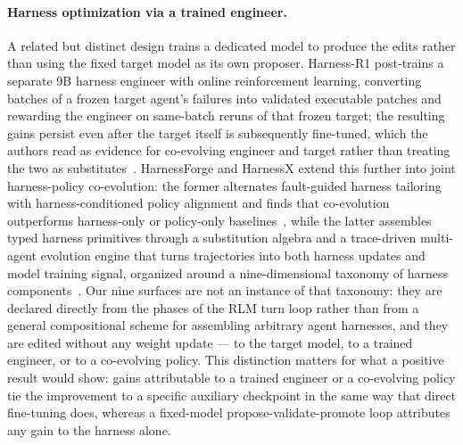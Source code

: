 \documentclass{article}
\begin{document}
\paragraph{Harness optimization via a trained engineer.}
A related but distinct design trains a dedicated model to produce the edits rather than using the fixed target model as its own proposer. Harness-R1 post-trains a separate 9B harness engineer with online reinforcement learning, converting batches of a frozen target agent's failures into validated executable patches and rewarding the engineer on same-batch reruns of that frozen target; the resulting gains persist even after the target itself is subsequently fine-tuned, which the authors read as evidence for co-evolving engineer and target rather than treating the two as substitutes~\citep{shao2026harnessr1}. HarnessForge and HarnessX extend this further into joint harness-policy co-evolution: the former alternates fault-guided harness tailoring with harness-conditioned policy alignment and finds that co-evolution outperforms harness-only or policy-only baselines~\citep{chen2026harnessforge}, while the latter assembles typed harness primitives through a substitution algebra and a trace-driven multi-agent evolution engine that turns trajectories into both harness updates and model training signal, organized around a nine-dimensional taxonomy of harness components~\citep{chen2026harnessx}. Our nine surfaces are not an instance of that taxonomy: they are declared directly from the phases of the RLM turn loop rather than from a general compositional scheme for assembling arbitrary agent harnesses, and they are edited without any weight update --- to the target model, to a trained engineer, or to a co-evolving policy. This distinction matters for what a positive result would show: gains attributable to a trained engineer or a co-evolving policy tie the improvement to a specific auxiliary checkpoint in the same way that direct fine-tuning does, whereas a fixed-model propose-validate-promote loop attributes any gain to the harness alone.
\end{document}
